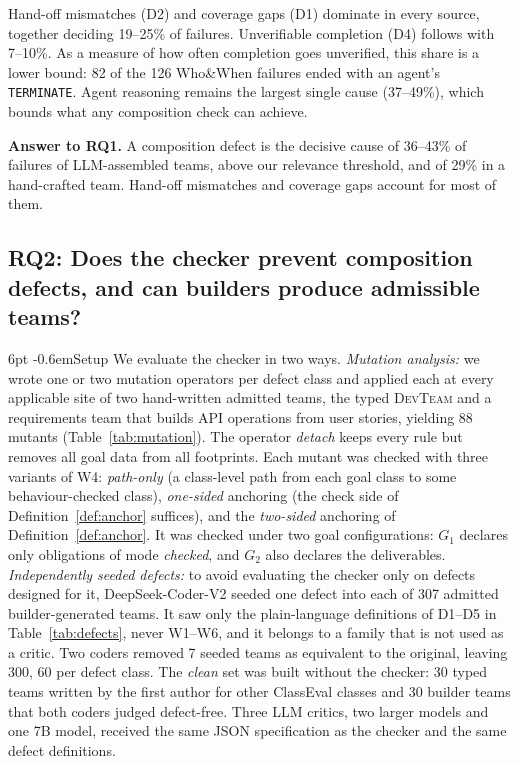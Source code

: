 \documentclass[pdflatex,sn-mathphys-num]{sn-jnl}
\makeatletter
\theoremstyle{thmstyleone}%
\theoremstyle{thmstyletwo}%
\theoremstyle{thmstylethree}%
\newcommand{\devteam}{\textsc{DevTeam}}
\newcommand{\W}[1]{\textsf{W#1}}
\newcommand{\D}[1]{\textsf{D#1}}
\newcommand{\code}[1]{\texttt{#1}}
\renewcommand\paragraph{\@startsection{paragraph}{4}{\z@}%
  {6pt \@plus 2pt \@minus 1pt}{-0.6em}{\normalfont\normalsize\bfseries}}
\makeatother
\begin{document}
Hand-off mismatches (\D{2}) and coverage gaps (\D{1}) dominate in every source,
together deciding 19--25\% of failures. Unverifiable completion (\D{4}) follows
with 7--10\%. As a measure of how often completion goes unverified, this share
is a lower bound: 82 of the 126 Who\&When failures ended with an agent's
\code{TERMINATE}. Agent reasoning remains the largest single cause (37--49\%),
which bounds what any composition check can achieve.

\begin{tcolorbox}[enhanced, colback=modelbg, colframe=modelbar, boxrule=0.5pt, arc=1pt, left=6pt, right=6pt, top=3pt, bottom=3pt]
\small\textbf{Answer to RQ1.} A composition defect is the decisive cause of
36--43\% of failures of LLM-assembled teams, above our relevance threshold, and of
29\% in a hand-crafted team. Hand-off mismatches and coverage gaps account for
most of them.
\end{tcolorbox}

\subsection{RQ2: Does the checker prevent composition defects, and can builders produce admissible teams?}\label{sec:res-rq2}

\paragraph{Setup} We evaluate the checker in two ways. \emph{Mutation
analysis:} we wrote one or two mutation operators per defect class and applied
each at every applicable site of two hand-written admitted teams, the typed
\devteam{} and a requirements team that builds API operations from user
stories, yielding 88 mutants (Table~\ref{tab:mutation}). The operator
\emph{detach} keeps every rule but removes all goal data from all footprints.
Each mutant was checked with three variants of \W{4}: \emph{path-only} (a
class-level path from each goal class to some behaviour-checked class),
\emph{one-sided} anchoring (the check side of Definition~\ref{def:anchor}
suffices), and the \emph{two-sided} anchoring of Definition~\ref{def:anchor}.
It was checked under two goal configurations: $G_1$ declares only obligations of
mode \emph{checked}, and $G_2$ also declares the deliverables.
\emph{Independently seeded defects:} to avoid evaluating the checker only on
defects designed for it, DeepSeek-Coder-V2 seeded one defect into each of 307
admitted builder-generated teams. It saw only the plain-language definitions of
\D{1}--\D{5} in Table~\ref{tab:defects}, never \W{1}--\W{6}, and it belongs to a
family that is not used as a critic. Two coders removed 7 seeded teams as
equivalent to the original, leaving 300, 60 per defect class. The \emph{clean}
set was built without the checker: 30 typed teams written by the first author
for other ClassEval classes and 30 builder teams that both coders judged
defect-free. Three LLM critics, two larger models and one 7B model, received
the same JSON specification as the checker and the same defect definitions.
\end{document}
